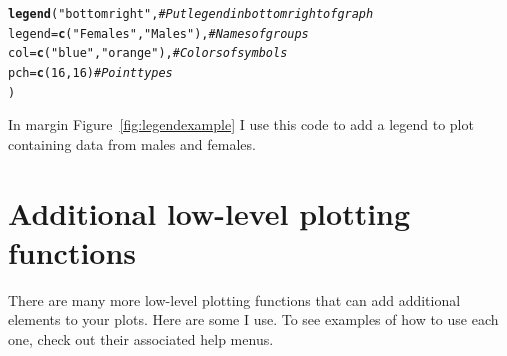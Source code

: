 \documentclass{tufte-book}\usepackage[]{graphicx}\usepackage[]{color}
\makeatletter
\newcommand{\hlnum}[1]{\textcolor[rgb]{0.686,0.059,0.569}{#1}}%
\newcommand{\hlstr}[1]{\textcolor[rgb]{0.192,0.494,0.8}{#1}}%
\newcommand{\hlcom}[1]{\textcolor[rgb]{0.678,0.584,0.686}{\textit{#1}}}%
\newcommand{\hlstd}[1]{\textcolor[rgb]{0.345,0.345,0.345}{#1}}%
\newcommand{\hlkwc}[1]{\textcolor[rgb]{0.333,0.667,0.333}{#1}}%
\newcommand{\hlkwd}[1]{\textcolor[rgb]{0.737,0.353,0.396}{\textbf{#1}}}%
\newenvironment{kframe}{%
 \def\at@end@of@kframe{}%
 \ifinner\ifhmode%
  \def\at@end@of@kframe{\end{minipage}}%
  \begin{minipage}{\columnwidth}%
 \fi\fi%
 \def\FrameCommand##1{\hskip\@totalleftmargin \hskip-\fboxsep
 \colorbox{shadecolor}{##1}\hskip-\fboxsep
     \hskip-\linewidth \hskip-\@totalleftmargin \hskip\columnwidth}%
 \MakeFramed {\advance\hsize-\width
   \@totalleftmargin\z@ \linewidth\hsize
   \@setminipage}}%
 {\par\unskip\endMakeFramed%
 \at@end@of@kframe}
\newenvironment{knitrout}{}{} %
\makeatother
\begin{document}
\begin{knitrout}
\color{fgcolor}\begin{kframe}
\begin{alltt}
\hlkwd{legend}\hlstd{(}\hlstr{"bottomright"}\hlstd{,} \hlcom{# Put legend in bottom right of graph}
       \hlkwc{legend} \hlstd{=} \hlkwd{c}\hlstd{(}\hlstr{"Females"}\hlstd{,} \hlstr{"Males"}\hlstd{),} \hlcom{# Names of groups}
       \hlkwc{col} \hlstd{=} \hlkwd{c}\hlstd{(}\hlstr{"blue"}\hlstd{,} \hlstr{"orange"}\hlstd{),} \hlcom{# Colors of symbols}
       \hlkwc{pch} \hlstd{=} \hlkwd{c}\hlstd{(}\hlnum{16}\hlstd{,} \hlnum{16}\hlstd{)} \hlcom{# Point types}
       \hlstd{)}
\end{alltt}
\end{kframe}
\end{knitrout}

In margin Figure~\ref{fig:legendexample} I use this code to add a legend to plot containing data from males and females.


\pagebreak
\section{Additional low-level plotting functions}

There are many more low-level plotting functions that can add additional elements to your plots. Here are some I use. To see examples of how to use each one, check out their associated help menus.
\end{document}
